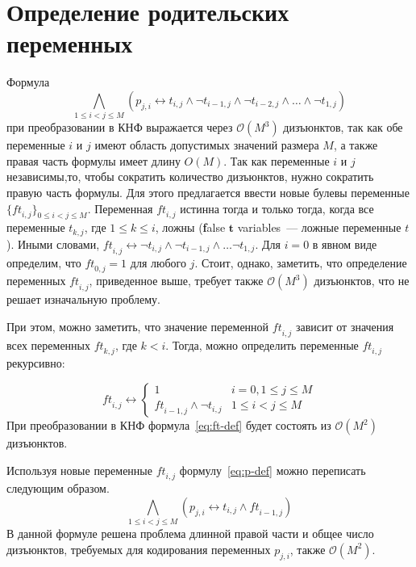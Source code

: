 \section{Определение родительских переменных}
\label{sec:tight:p-def}

Формула $$\bigwedge_{1 \leq i < j \leq M} \left(p_{j,i} \leftrightarrow t_{i,j} \wedge \neg t_{i - 1,j} \wedge \neg t_{i - 2, j} \wedge \ldots \wedge \neg t_{1,j}\right)$$ при преобразовании в КНФ выражается через $\mathcal{O}\left(M^{3}\right)$ дизъюнктов, так как обе переменные $i$ и $j$ имеют область допустимых значений размера $M$, а также правая часть формулы имеет длину $O\left(M\right)$.
Так как переменные $i$ и $j$ независимы,то, чтобы сократить количество дизъюнктов, нужно сократить правую часть формулы.
Для этого предлагается ввести новые булевы переменные $\{\mathit{ft}_{i,j}\}_{0 \leq i < j \leq M}$.
Переменная $\mathit{ft}_{i,j}$ истинна тогда и только тогда, когда все переменные $t_{k,j}$, где $1 \leq k \leq i$, ложны (\textbf{f}alse $\boldsymbol{t}$ variables~{---} ложные переменные $t$).
Иными словами, $\mathit{ft}_{i,j} \leftrightarrow \neg t_{i,j} \wedge \neg t_{i - 1, j} \wedge \ldots \neg t_{1,j}$. 
Для $i = 0$ в явном виде определим, что $\mathit{ft}_{0,j} = 1$ для любого $j$.
Стоит, однако, заметить, что определение переменных $\mathit{ft}_{i,j}$, приведенное выше, требует также $\mathcal{O}\left(M^3\right)$ дизъюнктов, что не решает изначальную проблему.

При этом, можно заметить, что значение переменной $\mathit{ft}_{i,j}$ зависит от значения всех переменных $\mathit{ft}_{k,j}$, где $k < i$. Тогда, можно определить переменные $\mathit{ft}_{i,j}$ рекурсивно:

\begin{equation}
\label{eq:ft-def}
  \mathit{ft}_{i,j} \leftrightarrow 
    \begin{cases} 
      1                               & i = 0, 1 \leq j \leq M \\
      \mathit{ft}_{i-1,j} \wedge \neg t_{i,j}  & 1 \leq i < j \leq M
    \end{cases} 
\end{equation}
%
При преобразовании в КНФ формула~\eqref{eq:ft-def} будет состоять из $\mathcal{O}\left(M^{2}\right)$ дизъюнктов.

Используя новые переменные $\mathit{ft}_{i,j}$ формулу~\eqref{eq:p-def} можно переписать следующим образом.
%
\begin{equation}
\label{eq:p-def-tight}
  \bigwedge_{1 \leq i < j \leq M} \left(p_{j,i} \leftrightarrow t_{i,j} \wedge \mathit{ft}_{i-1,j}\right)
\end{equation}
%
В данной формуле решена проблема длинной правой части и общее число дизъюнктов, требуемых для кодирования переменных $p_{j,i}$, также $\mathcal{O}\left(M^{2}\right)$. 

